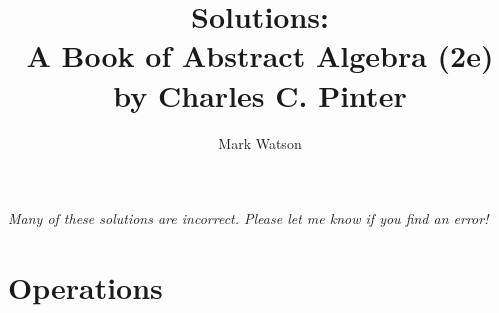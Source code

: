 \documentclass[12pt,letterpaper,onecolumn]{article}
\author{Mark Watson}
\title{Solutions:\\A Book of Abstract Algebra (2e)\\by Charles C. Pinter}
\begin{document}
\maketitle

\begin{small} \it{Many of these solutions are incorrect. Please let me know if you find an error!}
\end{small}



\section{Operations}

\end{document}
